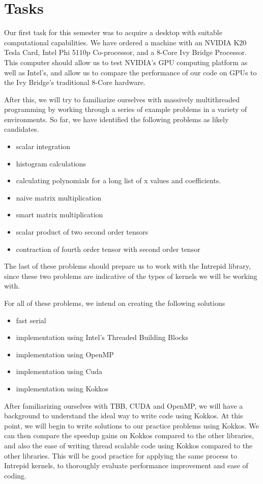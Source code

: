 \documentclass[proposal]{hmcclinic}
\begin{document}
\section{Tasks}

Our first task for this semester was to acquire a desktop with suitable
computational capabilities. We have ordered a machine with an NVIDIA K20 Tesla
Card, Intel Phi 5110p Co-processor, and a 8-Core Ivy Bridge Processor. This
computer should allow us to test NVIDIA's GPU computing platform as well as
Intel's, and allow us to compare the performance of our code on GPUs to the Ivy
Bridge's traditional 8-Core hardware.

After this, we will try to familiarize ourselves with massively multithreaded
programming by working through a series of example problems in a variety of
environments. So far, we have identified the following problems as likely
candidates.
\begin{itemize}
	\item scalar integration
	\item histogram calculations
	\item calculating polynomials for a long list of x values and coefficients.
	\item naive matrix multiplication
	\item smart matrix multiplication
	\item scalar product of two second order tensors 
	\item contraction of fourth order tensor with second order tensor
\end{itemize}
The last of these problems should prepare us to work with the Intrepid library, since these
two problems are indicative of the types of kernels we will be working with.

For all of these problems, we intend on creating the following solutions
\begin{itemize}
	\item fast serial
	\item implementation using Intel's Threaded Building Blocks
	\item implementation using OpenMP
	\item implementation using Cuda
	\item implementation using Kokkos
\end{itemize} After familiarizing ourselves with TBB, CUDA and OpenMP, we will
have a background to understand the ideal way to write code using Kokkos. At
this point, we will begin to write solutions to our practice problems using
Kokkos.  We can then compare the speedup gains on Kokkos compared to the other
libraries, and also the ease of writing thread scalable code using Kokkos
compared to the other libraries. This will be good practice for applying the
same process to Intrepid kernels, to thoroughly evaluate performance improvement
and ease of coding.
\end{document}
